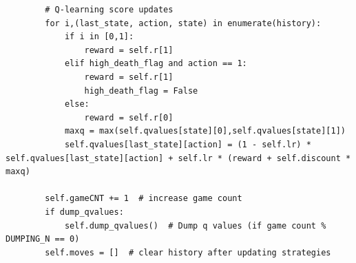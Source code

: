 \documentclass[a4paper, 11pt]{article}
\begin{document}
\begin{enumerate}
\begin{lstlisting}
        # Q-learning score updates
        for i,(last_state, action, state) in enumerate(history):
            if i in [0,1]:
                reward = self.r[1]
            elif high_death_flag and action == 1:
                reward = self.r[1]
                high_death_flag = False
            else:
                reward = self.r[0]
            maxq = max(self.qvalues[state][0],self.qvalues[state][1])
            self.qvalues[last_state][action] = (1 - self.lr) * self.qvalues[last_state][action] + self.lr * (reward + self.discount * maxq)

        self.gameCNT += 1  # increase game count
        if dump_qvalues:
            self.dump_qvalues()  # Dump q values (if game count % DUMPING_N == 0)
        self.moves = []  # clear history after updating strategies
\end{lstlisting}
\end{enumerate}

%
%
\end{document}
